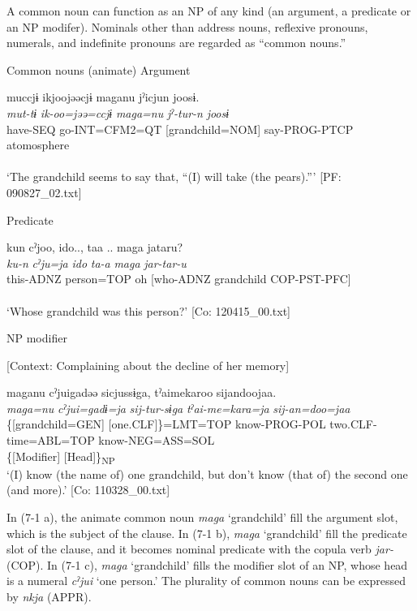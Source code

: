A common noun can function as an NP of any kind (an argument, a predicate or an NP modifer). Nominals other than address nouns, reflexive pronouns, numerals, and indefinite pronouns are regarded as “common nouns.”

\ea \label{ex:7:1}  Common nouns (animate)
\ea \label{ex:7:a}Argument

\gllll  muccjɨ  ikjoojəəcjɨ  maganu  jˀicjun   joosɨ.\\
\textit{mut-tɨ}  \textit{ik-oo=jəə=ccjɨ}  \textit{maga=nu}  \textit{jˀ-tur-n}   \textit{joosɨ}\\
have-SEQ  go-INT=CFM2=QT  [grandchild=NOM]  say-PROG-PTCP atomosphere\\
[Subject]  \\
\glt ‘The grandchild seems to say that, “(I) will take (the pears).”’ [PF: 090827\_02.txt]

\ex \label{ex:7:b}Predicate

\gllll  kun  cˀjoo,  ido..,  taa ..  maga   jataru?\\
\textit{ku-n}  \textit{cˀju=ja}  \textit{ido}  \textit{ta-a}  \textit{maga} \textit{jar-tar-u}\\
this-ADNZ  person=TOP  oh  [who-ADNZ  grandchild COP-PST-PFC]\\
[Nominal predicate]\\
\glt ‘Whose grandchild was this person?’ [Co: 120415\_00.txt]

\ex \label{ex:7:c}NP modifier

    [Context: Complaining about the decline of her memory]

\gllll  maganu  cˀjuigadəə  sicjussɨga,                                tˀaimekaroo  sijandoojaa.\\
\textit{maga=nu}  \textit{cˀjui=gadɨ=ja}  \textit{sij-tur-sɨga}         \textit{tˀai-me=kara=ja}  \textit{sij-an=doo=jaa}\\
\{[grandchild=GEN]  [one.CLF]\}=LMT=TOP  know-PROG-POL                  two.CLF-time=ABL=TOP  know-NEG=ASS=SOL\\
\{[Modifier]  [Head]\}\textsubscript{NP}  \\
\glt ‘(I) know (the name of) one grandchild, but don’t know (that of) the second one (and more).’ [Co: 110328\_00.txt]
\z
\z

In (7-1 a), the animate common noun \textit{maga} ‘grandchild’ fill the argument slot, which is the subject of the clause. In (7-1 b), \textit{maga} ‘grandchild’ fill the predicate slot of the clause, and it becomes nominal predicate with the copula verb \textit{jar-} (COP). In (7-1 c), \textit{maga} ‘grandchild’ fills the modifier slot of an NP, whose head is a numeral \textit{cˀjui} ‘one person.’ The plurality of common nouns can be expressed by \textit{nkja} (APPR).

